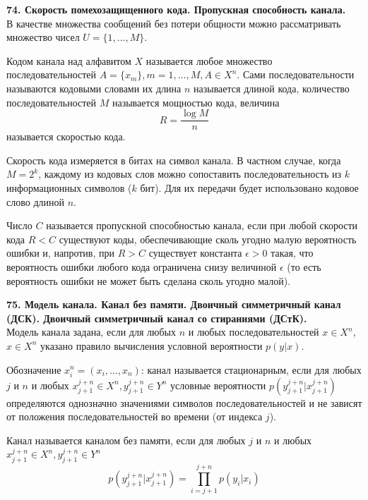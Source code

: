 \documentclass[14pt]{article}
\begin{document}
\bigskip
\textbf{74. Скорость помехозащищенного кода. Пропускная способность канала.} \\

В качестве множества сообщений без потери общности можно
рассматривать множество чисел \(U = \{1,...,M\}\).

Кодом канала над алфавитом \(X\) называется любое множество последовательностей \(A = \{x_m\}, m = 1, ..., M, A \in X^n\). Сами последовательности называются кодовыми словами их длина \(n\) называется длиной кода, количество последовательностей \(M\) называется мощностью кода, величина
\begin{displaymath}
    R = \frac{\log M}{n}
\end{displaymath}
называется скоростью кода. 

Скорость кода измеряется в битах на символ канала. В частном случае, когда \(M = 2^k\), каждому из кодовых слов можно сопоставить последовательность из \(k\) информационных символов (\(k\) бит). Для их передачи будет использовано кодовое слово длиной \(n\).

Число \(C\) называется пропускной способностью канала, если при любой скорости кода \(R < C\) существуют коды, обеспечивающие сколь угодно малую вероятность ошибки и, напротив, при \(R > C\) существует константа \(\epsilon > 0\) такая, что вероятность ошибки любого кода ограничена снизу величиной \(\epsilon\) (то есть вероятность ошибки не может быть сделана сколь угодно малой).

\bigskip
\textbf{75. Модель канала. Канал без памяти. Двоичный симметричный канал (ДСК). Двоичный симметричный канал со стираниями (ДСтК).} \\

Модель канала задана, если для любых \(n\) и любых последовательностей \(x \in X^n\), \(x \in X^n\) указано правило вычисления условной вероятности \(p(y|x)\).

Обозначение \(x_i^n = (x_i, ..., x_n)\): канал называется стационарным, если для любых \(j\) и \(n\) и любых \(x_{j+1}^{j+n} \in X^n, y_{j+1}^{j+n} \in Y^n\) условные вероятности \(p(y_{j+1}^{j+n}|x_{j+1}^{j+n})\) определяются однозначно значениями символов последовательностей и не зависят от положения последовательностей во времени (от индекса \(j\)).

Канал называется каналом без памяти, если для любых \(j\) и \(n\) и любых \(x_{j+1}^{j+n} \in X^n, y_{j+1}^{j+n} \in Y^n\)
\begin{displaymath}
    p(y_{j+1}^{j+n}|x_{j+1}^{j+n}) = \prod_{i=j+1}^{j+n} p(y_i|x_i)
\end{displaymath}
\end{document}
